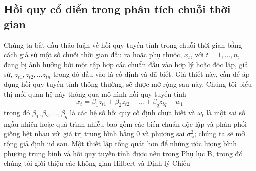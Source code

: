 \documentclass[12pt, a4paper,oneside]{book}
\theoremstyle{definition}
\begin{document}
\subsection{\label{hqcd}Hồi quy cổ điển trong phân tích chuỗi thời gian}
Chúng ta bắt đầu thảo luận về hồi quy tuyến tính trong chuỗi thời gian bằng cách giả sử một số chuỗi thời gian đầu ra hoặc phụ thuộc, $x_{t}$, với $t = 1 ,. . . , n$, đang bị ảnh hưởng bởi một tập hợp các chuẩn đầu vào hợp lý hoặc độc lập, giả sử, $z_{t1}, z_{t2},...z_{tn}$ trong đó đầu vào là cố định và đã biết. Giả thiết này, cần để áp dụng hồi quy tuyến tính thông thường, sẽ được mở rộng sau này. Chúng tôi biểu thị mối quan hệ này thông qua mô hình hồi quy tuyến tính 
\begin{equation}
x_{t}=\beta_{1}z_{t1} + \beta_{2}z_{t2} +...+ \beta_{q}z_{tq} +w_{1} \label{ct1.44}
\end{equation}
trong đó $\beta_{1},\beta_{2},...,\beta_{q}$ là các hệ số hồi quy cố định chưa biết và $ {\omega_{t}} $ là một sai số ngẫu nhiên hoặc quá trình nhiễu bao gồm các biến chuẩn độc lập và phân phối giống hệt nhau với giá trị trung bình bằng 0 và phương sai $ \sigma_{\omega}^{2} $; chúng ta sẽ mở rộng giả định iid sau. Một thiết lập tổng quát hơn để nhúng ước lượng bình phương trung bình và hồi quy tuyến tính được nêu trong Phụ lục B, trong đó chúng tôi giới thiệu các không gian Hilbert và Định lý Chiếu
\end{document}
